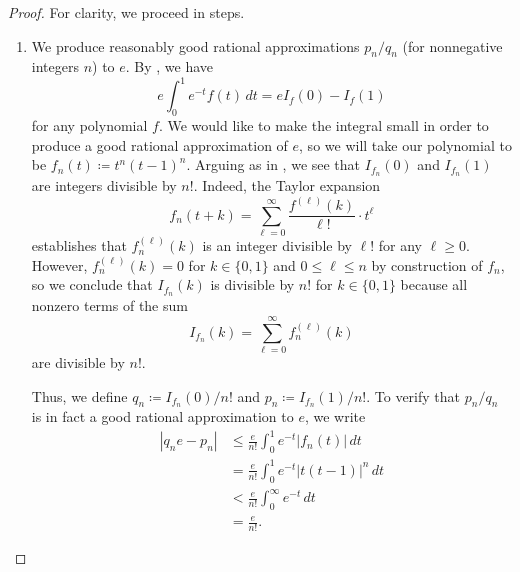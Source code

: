 \documentclass[../notes.tex]{subfiles}
\begin{document}
\begin{proof}
	For clarity, we proceed in steps.
	\begin{enumerate}
		\item We produce reasonably good rational approximations $p_n/q_n$ (for nonnegative integers $n$) to $e$. By , we have
		\[e\int_0^1e^{-t}f(t)\,dt=eI_f(0)-I_f(1)\]
		for any polynomial $f$. We would like to make the integral small in order to produce a good rational approximation of $e$, so we will take our polynomial to be $f_n(t)\coloneqq t^n(t-1)^n$. Arguing as in , we see that $I_{f_n}(0)$ and $I_{f_n}(1)$ are integers divisible by $n!$. Indeed, the Taylor expansion
		\[f_n(t+k)=\sum_{\ell=0}^\infty\frac{f^{(\ell)}(k)}{\ell!}\cdot t^\ell\]
		establishes that $f_n^{(\ell)}(k)$ is an integer divisible by $\ell!$ for any $\ell\ge0$. However, $f_n^{(\ell)}(k)=0$ for $k\in\{0,1\}$ and $0\le\ell\le n$ by construction of $f_n$, so we conclude that $I_{f_n}(k)$ is divisible by $n!$ for $k\in\{0,1\}$ because all nonzero terms of the sum
		\[I_{f_n}(k)=\sum_{\ell=0}^\infty f_n^{(\ell)}(k)\]
		are divisible by $n!$.
	
		Thus, we define $q_n\coloneqq I_{f_n}(0)/n!$ and $p_n\coloneqq I_{f_n}(1)/n!$. To verify that $p_n/q_n$ is in fact a good rational approximation to $e$, we write
		\begin{align*}
			\left|q_ne-p_n\right| &\le \frac e{n!}\int_0^1e^{-t}\left|f_n(t)\right|\,dt \\
			&= \frac e{n!}\int_0^1e^{-t}\left|t(t-1)\right|^n\,dt \\
			&< \frac e{n!}\int_0^\infty e^{-t}\,dt \\
			&= \frac e{n!}.
		\end{align*}


\end{enumerate}
\end{proof}
\end{document}
